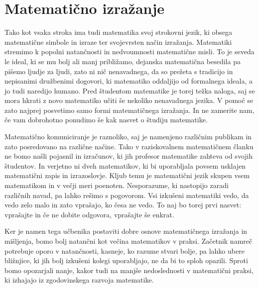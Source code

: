 \chapter{Matematično izražanje}
\label{cha:matematicno-izrazanje}

Tako kot vsaka stroka ima tudi matematika svoj strokovni jezik, ki obsega matematične
simbole in izraze ter svojevrsten način izražanja. Matematiki stremimo k popolni
natančnosti in nedvoumnosti matematične misli. To je seveda le ideal, ki se mu bolj ali
manj približamo, dejanska matematična besedila pa pišemo ljudje za ljudi, zato ni nič
nenavadnega, da so prežeta s tradicijo in nepisanimi družbenimi dogovori, ki matematiko
oddaljijo od formalnega ideala, a jo tudi naredijo humano.
%
Pred študentom matematike je torej težka naloga, saj se mora hkrati z novo matematiko
učiti še nekoliko nenavadnega jezika. V pomoč se zato najprej posvetimo samo formi
matematičnega izražanja. In ne zamerite nam, če vam dobrohotno ponudimo še kak nasvet o
študiju matematike.

Matematično komuniciranje je raznoliko, saj je namenjeno različnim publikam in zato
posredovano na različne načine. Tako v raziskovalnem matematičnem članku ne bomo našli
pojasnil in izračunov, ki jih profesor matematike zahteva od svojih študentov. In verjetno
ni dveh matematikov, ki bi uporabljala povsem usklajen matematični zapis in izrazoslovje.
Kljub temu je matematični jezik skupen vsem matematikom in v večji meri poenoten.
Nesporazume, ki nastopijo zaradi različnih navad, pa lahko rešimo s pogovorom. Vsi
izkušeni matematiki vedo, da vedo zelo malo in zato vprašajo, ko česa ne vedo. To naj bo
torej prvi nasvet: vprašajte in če ne dobite odgovora, vprašajte še enkrat.

Ker je namen tega učbenika postaviti dobre osnove matematičnega izražanja in mišljenja,
bomo bolj natančni kot večina matematikov v praksi. Začetnik namreč potrebuje oporo v
natančnosti, kasneje, ko razume stvari bolje, pa lahko ubere bližnjice, ki jih bolj
izkušeni kolegi uporabljajo, ne da bi to sploh opazili. Sproti bomo opozarjali nanje,
kakor tudi na manjše nedoslednosti v matematični praksi, ki izhajajo iz zgodovinskega
razvoja matematike.



